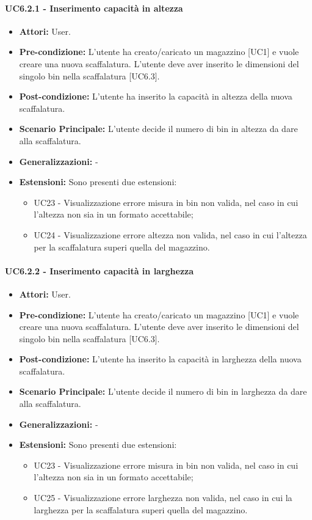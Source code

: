 \paragraph{UC6.2.1 - Inserimento capacità in altezza}
\begin{itemize}
    \item \textbf{Attori:} User.
    \item \textbf{Pre-condizione:} L'utente ha creato/caricato un magazzino [UC1] e vuole creare una nuova scaffalatura. L'utente deve aver inserito le dimensioni del singolo bin nella scaffalatura [UC6.3].
    \item \textbf{Post-condizione:}  L'utente ha inserito la capacità in altezza della nuova scaffalatura.
    \item \textbf{Scenario Principale:}  L'utente decide il numero di bin in altezza da dare alla scaffalatura. 
    \item \textbf{Generalizzazioni:} -
    \item \textbf{Estensioni:} Sono presenti due estensioni:
    \begin{itemize}
        \item UC23 - Visualizzazione errore misura in bin non valida, nel caso in cui l'altezza non sia in un formato accettabile;
        \item UC24 - Visualizzazione errore altezza non valida, nel caso in cui l'altezza per la scaffalatura superi quella del magazzino.
    \end{itemize}
\end{itemize}


\paragraph{UC6.2.2 - Inserimento capacità in larghezza}
\begin{itemize}
    \item \textbf{Attori:} User.
    \item \textbf{Pre-condizione:} L'utente ha creato/caricato un magazzino [UC1] e vuole creare una nuova scaffalatura. L'utente deve aver inserito le dimensioni del singolo bin nella scaffalatura [UC6.3].
    \item \textbf{Post-condizione:}  L'utente ha inserito la capacità in larghezza della nuova scaffalatura.
    \item \textbf{Scenario Principale:}  L'utente decide il numero di bin in larghezza da dare alla scaffalatura.
    \item \textbf{Generalizzazioni:} -
    \item \textbf{Estensioni:} Sono presenti due estensioni:
    \begin{itemize}
        \item UC23 - Visualizzazione errore misura in bin non valida, nel caso in cui l'altezza non sia in un formato accettabile;
        \item UC25 - Visualizzazione errore larghezza non valida, nel caso in cui la larghezza per la scaffalatura superi quella del magazzino.
    \end{itemize}
\end{itemize}


